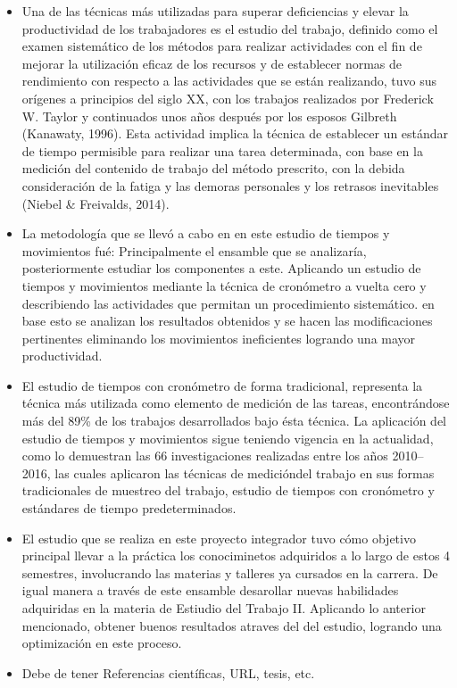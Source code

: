     \begin{itemize}
    
    
         \item Una de las técnicas más utilizadas para superar deficiencias y elevar la productividad de los trabajadores es el estudio del trabajo, definido como el examen sistemático de los métodos para realizar actividades con el fin de mejorar la utilización eficaz de los recursos y de establecer normas de rendimiento con respecto a las actividades que se están realizando, tuvo sus orígenes a principios del siglo XX, con los trabajos realizados por Frederick W. Taylor y continuados unos años después por los esposos Gilbreth (Kanawaty, 1996). Esta actividad implica la técnica de establecer un estándar de tiempo permisible para realizar una tarea determinada, con base en la medición del contenido de trabajo del método prescrito, con la debida consideración de la fatiga y las demoras personales y los retrasos inevitables (Niebel \& Freivalds, 2014).
        \item La metodología que se llevó a cabo en en este estudio de tiempos y movimientos fué: Principalmente el ensamble que se analizaría, posteriormente estudiar los componentes a este. Aplicando un estudio de tiempos y movimientos mediante la técnica de cronómetro a vuelta cero y describiendo las actividades que permitan un procedimiento sistemático. en base esto se analizan los resultados obtenidos y se hacen las modificaciones pertinentes eliminando los movimientos ineficientes logrando una mayor productividad. 
        
        \item El estudio de tiempos con cronómetro de forma tradicional, representa la técnica más utilizada como elemento de medición de las tareas, encontrándose más del 89\% de los trabajos desarrollados bajo ésta técnica.
        La aplicación del estudio de tiempos y movimientos sigue teniendo vigencia en la actualidad, como lo demuestran las 66 investigaciones realizadas entre los años 2010–2016, las cuales aplicaron las técnicas de medicióndel trabajo en sus formas tradicionales de muestreo del trabajo, estudio de tiempos con cronómetro y estándares de tiempo predeterminados.
        \item El estudio que se realiza en este proyecto integrador tuvo cómo objetivo principal llevar a la práctica los conociminetos adquiridos a lo largo de estos 4 semestres, involucrando las materias y talleres ya cursados en la carrera. De igual manera a través de este ensamble desarollar nuevas habilidades adquiridas en la materia de Estiudio del Trabajo II. Aplicando lo anterior mencionado, obtener buenos resultados atraves del del estudio, logrando una optimización en este proceso.
        \item Debe de tener Referencias científicas, URL, tesis, etc.
    \end{itemize}
